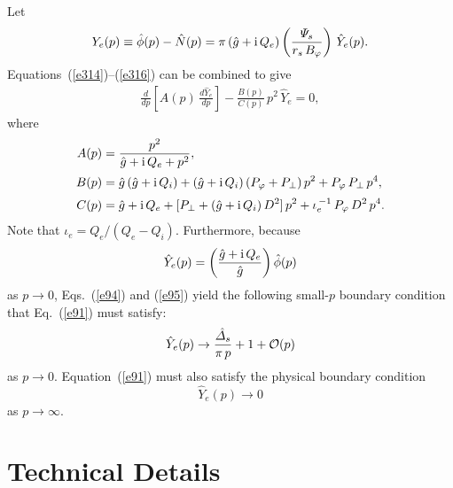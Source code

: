 \documentclass[12pt,prb,aps,notitlepage]{revtex4-1}
\begin{document}
Let 
\begin{align}\label{e95}
Y_e(p)\equiv \hat{\phi}(p)-\hat{N}(p)= \pi\,(\hat{g}+{\rm i}\,Q_e)\left(\frac{{\mit\Psi}_s}{r_s\,B_\varphi}\right)\,\hat{Y}_e(p).
\end{align}
 Equations~(\ref{e314})--(\ref{e316}) can be combined to give 
\begin{align}\label{e91}
\frac{d}{dp}\!\left[A(p)\,\frac{d\hat{Y}_e}{dp}\right] - \frac{B(p)}{C(p)}\,p^2\,\hat{Y}_e=0,
\end{align}
where
\begin{align}
A(p) &= \frac{p^2}{\hat{g}+{\rm i}\,Q_e+p^2},\label{e97a}\\[0.5ex]
B(p)&=\hat{g}\,(\hat{g}+{\rm i}\,Q_i)+(\hat{g}+{\rm i}\,Q_i)\,(P_\varphi+P_\perp)\,p^2 + P_\varphi\,P_\perp\,p^4,\\[0.5ex]
C(p) &=\hat{g}+{\rm i}\,Q_e+ [P_\perp+
(\hat{g}+{\rm i}\,Q_i)\,D^2]\,p^2 + \iota_e^{\,-1}\,P_\varphi\,D^2\,p^4.
\end{align}
Note that $\iota_e = Q_e/(Q_e-Q_i)$. 
Furthermore, because
\begin{equation}
\hat{Y}_e(p) = \left(\frac{\hat{g}+{\rm i}\,Q_e}{\hat{g}}\right)\hat{\phi}(p)
\end{equation}
as $p\rightarrow 0$, Eqs.~(\ref{e94}) and (\ref{e95})
yield the following small-$p$ boundary condition that Eq.~(\ref{e91}) must satisfy:\,\cite{ed}
\begin{equation}\label{e101}
\hat{Y}_e(p)\rightarrow\frac{\hat{\mit\Delta}_s}{\pi\,p} + 1+ {\cal O}(p)
\end{equation}
as $p\rightarrow 0$.  Equation~(\ref{e91}) must also satisfy the  physical boundary condition 
\begin{equation}\label{e102}
\hat{Y}_e(p)\rightarrow 0
\end{equation}
as $p\rightarrow\infty$. 

\section{Technical Details}
\end{document}
